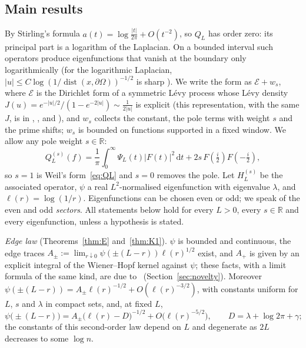 \documentclass[11pt]{amsart}
\newcommand{\R}{\mathbb{R}}
\newcommand{\cE}{\mathcal{E}}
\newcommand{\dd}{\,\mathrm{d}}
\DeclareMathOperator{\dist}{dist}
\theoremstyle{definition}
\theoremstyle{remark}
\numberwithin{equation}{section}
\begin{document}
\subsection{Main results}
By Stirling's formula $a(t)=\log\frac{|t|}{2\pi}+O(t^{-2})$, so $Q_L$ has order zero: its principal part is a logarithm of the Laplacian. On a bounded interval such operators produce eigenfunctions that vanish at the boundary only logarithmically (for the logarithmic Laplacian, $|u|\le C\log(1/\dist(x,\partial\Omega))^{-1/2}$ is sharp \cite[Thms.~1.1,~1.2]{HLS25}). We write the form as $\cE+w_s$, where $\cE$ is the Dirichlet form of a symmetric L\'evy process whose L\'evy density $J(u)=e^{-|u|/2}/(1-e^{-2|u|})\sim\frac1{2|u|}$ is explicit (this representation, with the same $J$, is in \cite[\S2.4]{Suz26}, \cite{And1}, \cite[\S2.2]{Oen} and \cite[(3.1)--(3.3)]{BT26}), and $w_s$ collects the constant, the pole terms with weight $s$ and the prime shifts; $w_s$ is bounded on functions supported in a fixed window. We allow any pole weight $s\in\R$:
\begin{equation}\label{eq:Qs}
Q^{(s)}_L(f)=\frac1\pi\int_0^\infty\Psi_L(t)|F(t)|^2\dd t+2s\,F(\tfrac i2)F(-\tfrac i2),
\end{equation}
so $s=1$ is Weil's form~\eqref{eq:QL} and $s=0$ removes the pole. Let $H^{(s)}_L$ be the associated operator, $\psi$ a real $L^2$-normalised eigenfunction with eigenvalue $\lambda$, and $\ell(r)=\log(1/r)$. Eigenfunctions can be chosen even or odd; we speak of the even and odd \emph{sectors}. All statements below hold for every $L>0$, every $s\in\R$ and every eigenfunction, unless a hypothesis is stated.

\emph{Edge law} (Theorems~\ref{thm:E} and~\ref{thm:K1}). $\psi$ is bounded and continuous, the edge traces $A_\pm:=\lim_{r\downarrow0}\psi(\pm(L-r))\ell(r)^{1/2}$ exist, and $A_+$ is given by an explicit integral of the Wiener--Hopf kernel against $\psi$; these facts, with a limit formula of the same kind, are due to~\cite{BT26} (Section~\ref{sec:novelty}). Moreover $\psi(\pm(L-r))=A_\pm\ell(r)^{-1/2}+O(\ell(r)^{-3/2})$, with constants uniform for $L$, $s$ and $\lambda$ in compact sets, and, at fixed $L$,
\[
\psi\bigl(\pm(L-r)\bigr)=A_\pm\bigl(\ell(r)-D\bigr)^{-1/2}+O\bigl(\ell(r)^{-5/2}\bigr),\qquad D=\lambda+\log2\pi+\gamma ;
\]
the constants of this second-order law depend on $L$ and degenerate as $2L$ decreases to some $\log n$.
\end{document}
